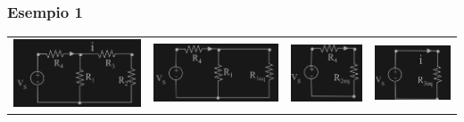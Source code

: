 \documentclass{article}
\begin{document}
\subsubsection{Esempio 1}
\begin{center}
    \begin{tabular}{c c c c}
    \includegraphics[scale=0.25]{Image/Esempio1_1.png}
    &
    \includegraphics[scale=0.25]{Image/Esempio1_2.png}
    &
    \includegraphics[scale=0.27]{Image/Esempio1_3.png}
    & 
    \includegraphics[scale=0.27]{Image/Esempio1_4.png}\\

\end{tabular}
\end{center}
\end{document}
